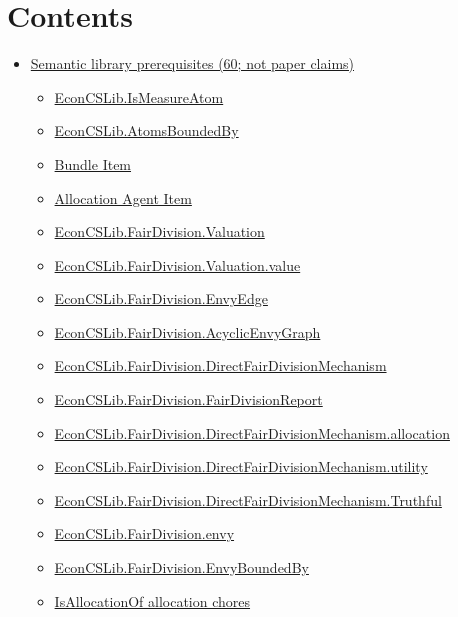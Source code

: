 \documentclass[10pt]{article}
\begin{document}
\section*{Contents}
\begin{itemize}[leftmargin=1.2em]
\item \hyperlink{library-section-bfc2e465721d8fbf}{Semantic library prerequisites (60; not paper claims)}
\begin{itemize}[leftmargin=1.2em]
\item \hyperlink{library-prerequisite-b87a3ae548e5b329}{EconCSLib.IsMeasureAtom}
\item \hyperlink{library-prerequisite-f803a588579f245d}{EconCSLib.AtomsBoundedBy}
\item \hyperlink{library-prerequisite-3240074e96589b21}{Bundle Item}
\item \hyperlink{library-prerequisite-9933ac127bcc0808}{Allocation Agent Item}
\item \hyperlink{library-prerequisite-71ba1ae206168001}{EconCSLib.FairDivision.Valuation}
\item \hyperlink{library-prerequisite-bdbf74993e914de3}{EconCSLib.FairDivision.Valuation.value}
\item \hyperlink{library-prerequisite-95bee1261923c486}{EconCSLib.FairDivision.EnvyEdge}
\item \hyperlink{library-prerequisite-c7feb8de5c86fc9f}{EconCSLib.FairDivision.AcyclicEnvyGraph}
\item \hyperlink{library-prerequisite-c4e79a795be89932}{EconCSLib.FairDivision.DirectFairDivisionMechanism}
\item \hyperlink{library-prerequisite-6766ab054a0a1923}{EconCSLib.FairDivision.FairDivisionReport}
\item \hyperlink{library-prerequisite-ede64e9a0dc4b23a}{EconCSLib.FairDivision.DirectFairDivisionMechanism.allocation}
\item \hyperlink{library-prerequisite-660b7f61bafcad46}{EconCSLib.FairDivision.DirectFairDivisionMechanism.utility}
\item \hyperlink{library-prerequisite-883c47a34bc33fc9}{EconCSLib.FairDivision.DirectFairDivisionMechanism.Truthful}
\item \hyperlink{library-prerequisite-69c0da78adbb61d7}{EconCSLib.FairDivision.envy}
\item \hyperlink{library-prerequisite-c9107c7dd434c8f1}{EconCSLib.FairDivision.EnvyBoundedBy}
\item \hyperlink{library-prerequisite-272962efb2ddede6}{IsAllocationOf allocation chores}

\end{itemize}
\end{itemize}
\end{document}
